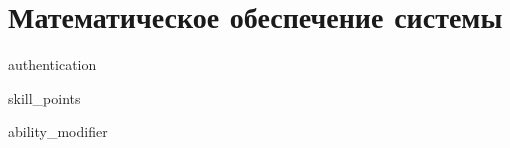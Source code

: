\section{Математическое обеспечение системы}
\label{sec:math}

{authentication}

{skill_points}

{ability_modifier}

\newpage
